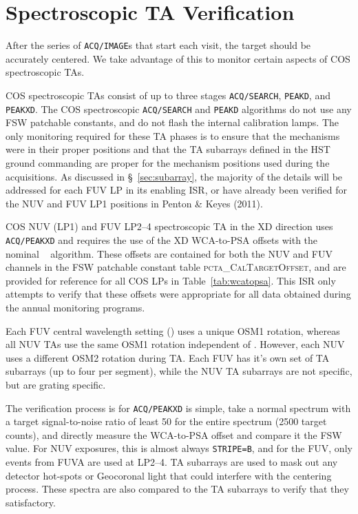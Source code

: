 \section{Spectroscopic TA Verification}\label{sec:spVER}
\normalsize
After the series of \texttt{ACQ/IMAGE}s that start each visit, the target should be accurately centered.
We take advantage of this to monitor certain aspects of COS spectroscopic TAs.

COS spectroscopic TAs consist of up to three stages \texttt{ACQ/SEARCH}, \texttt{PEAKD}, and \texttt{PEAKXD}.
The COS spectroscopic \texttt{ACQ/SEARCH} and \texttt{PEAKD} algorithms do not use any FSW patchable constants, and do not flash the
internal calibration lamps. The only monitoring required for these TA phases is to ensure that the mechanisms were in their proper
positions and that the TA subarrays defined in the HST ground commanding are proper for the mechanism positions used during the acquisitions.
As discussed in \S~\ref{sec:subarray}, the majority of the details will be addressed for each FUV LP in its enabling ISR, or have already been verified
for the NUV and FUV LP1 positions in Penton \& Keyes (2011).

COS NUV (LP1) and FUV LP2--4 spectroscopic TA in the XD direction uses \texttt{ACQ/PEAKXD} and requires the use of the XD WCA-to-PSA offsets with the nominal \numposone~ algorithm.
These offsets are contained for both the NUV and FUV channels in the FSW patchable constant table \textsc{pcta\_CalTargetOffset}, and are provided for reference for all COS LPs in Table~\ref{tab:wcatopsa}.
This ISR only attempts to verify that these offsets were appropriate for all data obtained during the annual monitoring programs.

Each FUV central wavelength setting (\cenwave) uses a unique OSM1 rotation, whereas all NUV TAs use the same OSM1 rotation independent of \cenwave.
However, each NUV \cenwave uses a different OSM2 rotation during TA. Each FUV \cenwave has it's own set of TA subarrays (up to four per segment), while the NUV TA subarrays are not \cenwave
specific, but are grating specific.

The verification process is for \texttt{ACQ/PEAKXD} is simple, take a normal spectrum with a target signal-to-noise ratio of least 50 for the entire spectrum (2500 target counts),
and directly measure the WCA-to-PSA offset and compare it the FSW value. For NUV exposures, this is almost always \texttt{STRIPE=B}, and for the FUV, only events from FUVA are used at LP2--4.
TA subarrays are used to mask out any detector hot-spots or Geocoronal light that could interfere with the centering process. These spectra are also compared to the TA subarrays to
verify that they satisfactory.


